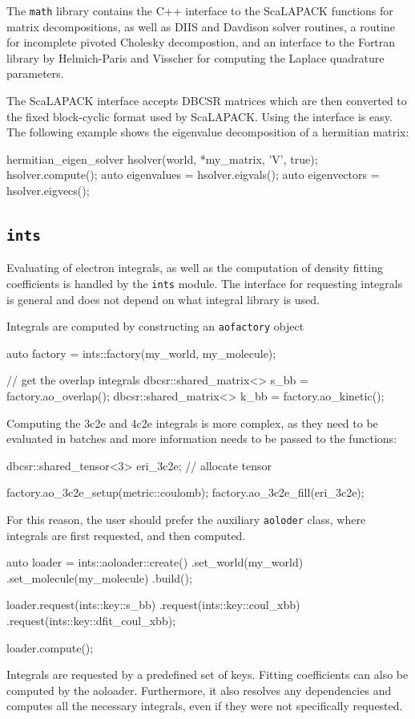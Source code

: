 The \texttt{math} library contains the C++ interface to the ScaLAPACK functions for matrix decompositions, as well as DIIS and Davdison solver routines, a routine for incomplete pivoted Cholesky decompostion, and an interface to the Fortran library by Helmich-Paris and Visscher \cite{Hel2016} for computing the Laplace quadrature parameters. 

The ScaLAPACK interface accepts DBCSR matrices which are then converted to the fixed block-cyclic format used by ScaLAPACK. Using the interface is easy. The following example shows the eigenvalue decomposition of a hermitian matrix:
\begin{cppinline}
hermitian_eigen_solver hsolver(world, *my_matrix, 'V', true);
hsolver.compute();
auto eigenvalues = hsolver.eigvals();
auto eigenvectors = hsolver.eigvecs();
\end{cppinline} 

\subsection{\texttt{ints}}

Evaluating of electron integrals, as well as the computation of density fitting coefficients is handled by the \texttt{ints} module. The interface for requesting integrals is general and does not depend on what integral library is used. 

Integrals are computed by constructing an \texttt{aofactory} object
\begin{cppinline}
auto factory = ints::factory(my_world, my_molecule);

// get the overlap integrals
dbcsr::shared_matrix<> s_bb = factory.ao_overlap();
dbcsr::shared_matrix<> k_bb = factory.ao_kinetic();
\end{cppinline}
\noindent Computing the 3c2e and 4c2e integrals is more complex, as they need to be evaluated in batches and more information needs to be passed to the functions:
\begin{cppinline}
dbcsr::shared_tensor<3> eri_3c2e;
// allocate tensor

factory.ao_3c2e_setup(metric::coulomb);
factory.ao_3c2e_fill(eri_3c2e);
\end{cppinline}
\noindent For this reason, the user should prefer the auxiliary  \texttt{aoloder} class, where integrals are first requested, and then computed.
\begin{cppinline}
auto loader = ints::aoloader::create()
	.set_world(my_world)
	.set_molecule(my_molecule)
	.build();
	
loader.request(ints::key::s_bb)
	.request(ints::key::coul_xbb)
	.request(ints::key::dfit_coul_xbb);
	
loader.compute();
\end{cppinline}
\noindent Integrals are requested by a predefined set of keys. Fitting coefficients can also be computed by the aoloader. Furthermore, it also resolves any dependencies and computes all the necessary integrals, even if they were not specifically requested. 

